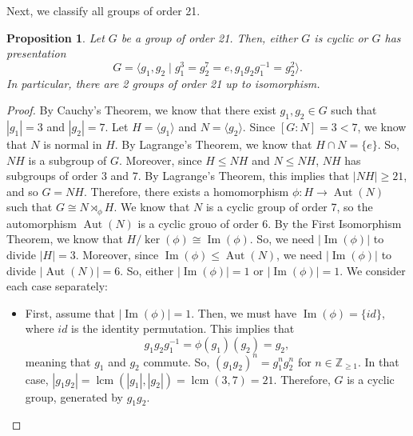 \documentclass[a4paper, openany]{memoir}
\theoremstyle{definition}
\theoremstyle{plain}
\newtheorem{proposition}[definition]{Proposition}
\begin{document}
\noindent Next, we classify all groups of order 21.
\begin{proposition}
Let $G$ be a group of order 21. Then, either $G$ is cyclic or $G$ has presentation
\[G = \langle g_1, g_2 \mid g_1^3 = g_2^7 = e, g_1g_2g_1^{-1} = g_2^2 \rangle.\]
In particular, there are 2 groups of order 21 up to isomorphism.
\end{proposition}
\begin{proof}
By Cauchy's Theorem, we know that there exist $g_1, g_2 \in G$ such that $|g_1| = 3$ and $|g_2| = 7$. Let $H = \langle g_1 \rangle$ and $N = \langle g_2 \rangle$. Since $[G: N] = 3 < 7$, we know that $N$ is normal in $H$. By Lagrange's Theorem, we know that $H \cap N = \{e\}$. So, $NH$ is a subgroup of $G$. Moreover, since $H \leqslant NH$ and $N \leqslant NH$, $NH$ has subgroups of order $3$ and $7$. By Lagrange's Theorem, this implies that $|NH| \geqslant 21$, and so $G = NH$. Therefore, there exists a homomorphism $\phi: H \to \operatorname{Aut}(N)$ such that $G \cong N \rtimes_{\phi} H$. We know that $N$ is a cyclic group of order 7, so the automorphism $\operatorname{Aut}(N)$ is a cyclic grouo of order 6. By the First Isomorphism Theorem, we know that $H/\ker (\phi) \cong \operatorname{Im}(\phi)$. So, we need $|\operatorname{Im}(\phi)|$ to divide $|H| = 3$. Moreover, since $\operatorname{Im}(\phi) \leqslant \operatorname{Aut}(N)$, we need $|\operatorname{Im}(\phi)|$ to divide $|\operatorname{Aut}(N)| = 6$. So, either $|\operatorname{Im}(\phi)| = 1$ or $|\operatorname{Im}(\phi)| = 1$. We consider each case separately:
\begin{itemize}
    \item First, assume that $|\operatorname{Im}(\phi)| = 1$. Then, we must have $\operatorname{Im}(\phi) = \{id\}$, where $id$ is the identity permutation. This implies that 
    \[g_1g_2g_1^{-1} = \phi(g_1)(g_2) = g_2,\]
    meaning that $g_1$ and $g_2$ commute. So, $(g_1g_2)^n = g_1^n g_2^n$ for $n \in \mathbb{Z}_{\geqslant 1}$. In that case, $|g_1g_2| = \operatorname{lcm}(|g_1|, |g_2|) = \operatorname{lcm}(3, 7) = 21$. Therefore, $G$ is a cyclic group, generated by $g_1g_2$.
    

\end{itemize}
\end{proof}
\end{document}
